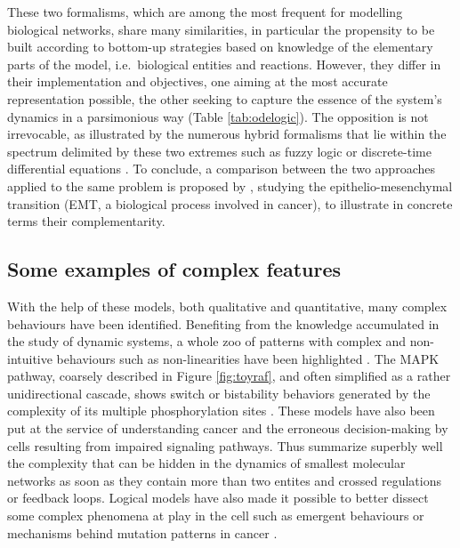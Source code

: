 \documentclass[a4paper,12pt,twoside,onecolumn,openright,final,oldfontcommands]{memoir}
\begin{document}
These two formalisms, which are among the most frequent for modelling
biological networks, share many similarities, in particular the
propensity to be built according to bottom-up strategies based on
knowledge of the elementary parts of the model, i.e.~biological entities
and reactions. However, they differ in their implementation and
objectives, one aiming at the most accurate representation possible, the
other seeking to capture the essence of the system's dynamics in a
parsimonious way (Table \ref{tab:odelogic}). The opposition is not
irrevocable, as illustrated by the numerous hybrid formalisms that lie
within the spectrum delimited by these two extremes such as fuzzy logic
or discrete-time differential equations
\citep{le2015quantitative, calzone2018logical}. To conclude, a
comparison between the two approaches applied to the same problem is
proposed by \citet{calzone2018logical}, studying the
epithelio-mesenchymal transition (EMT, a biological process involved in
cancer), to illustrate in concrete terms their complementarity.

\subsection{Some examples of complex
features}\label{some-examples-of-complex-features}

With the help of these models, both qualitative and quantitative, many
complex behaviours have been identified. Benefiting from the knowledge
accumulated in the study of dynamic systems, a whole zoo of patterns
with complex and non-intuitive behaviours such as non-linearities have
been highlighted \citep{tyson2003sniffers}. The MAPK pathway, coarsely
described in Figure \ref{fig:toyraf}, and often simplified as a rather
unidirectional cascade, shows switch or bistability behaviors generated
by the complexity of its multiple phosphorylation sites
\citep{markevich2004signaling}. These models have also been put at the
service of understanding cancer and the erroneous decision-making by
cells resulting from impaired signaling pathways. Thus
\citet{tyson2011dynamic} summarize superbly well the complexity that can
be hidden in the dynamics of smallest molecular networks as soon as they
contain more than two entites and crossed regulations or feedback loops.
Logical models have also made it possible to better dissect some complex
phenomena at play in the cell such as emergent behaviours
\citep{helikar2008emergent} or mechanisms behind mutation patterns in
cancer \citep{remy2015modeling}.
\end{document}
